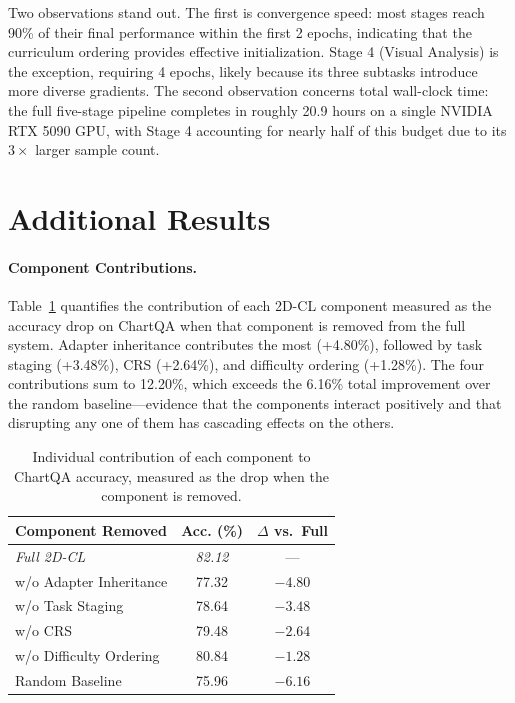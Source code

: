 ﻿\documentclass[journal]{IEEEtran}
\newcommand{\method}{2D-CL}
\newcommand{\crs}{CRS}
\begin{document}
Two observations stand out. The first is convergence speed: most stages reach 90\% of their final performance within the first 2 epochs, indicating that the curriculum ordering provides effective initialization. Stage 4 (Visual Analysis) is the exception, requiring 4 epochs, likely because its three subtasks introduce more diverse gradients. The second observation concerns total wall-clock time: the full five-stage pipeline completes in roughly 20.9 hours on a single NVIDIA RTX 5090 GPU, with Stage 4 accounting for nearly half of this budget due to its $3\times$ larger sample count.

\section{Additional Results}
\paragraph{Component Contributions.}
Table~\ref{tab:component_detail} quantifies the contribution of each \method{} component measured as the accuracy drop on ChartQA when that component is removed from the full system. Adapter inheritance contributes the most (+4.80\%), followed by task staging (+3.48\%), \crs{} (+2.64\%), and difficulty ordering (+1.28\%). The four contributions sum to 12.20\%, which exceeds the 6.16\% total improvement over the random baseline---evidence that the components interact positively and that disrupting any one of them has cascading effects on the others.

\begin{table}[!t]
\centering
\small
\begin{tabular}{lcc}
\toprule
\textbf{Component Removed} & \textbf{Acc. (\%)} & \textbf{$\Delta$ vs.\ Full} \\
\midrule
\textit{Full \method{}} & \textit{82.12} & --- \\
\midrule
w/o Adapter Inheritance & 77.32 & $-4.80$ \\
w/o Task Staging & 78.64 & $-3.48$ \\
w/o CRS & 79.48 & $-2.64$ \\
w/o Difficulty Ordering & 80.84 & $-1.28$ \\
\midrule
Random Baseline & 75.96 & $-6.16$ \\
\bottomrule
\end{tabular}
\caption{Individual contribution of each component to ChartQA accuracy, measured as the drop when the component is removed.}
\label{tab:component_detail}
\end{table}
\end{document}
